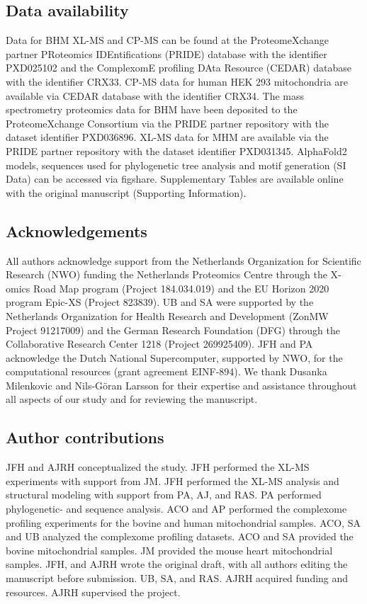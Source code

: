 \subsection*{Data availability}
Data for BHM XL-MS and CP-MS can be found at the ProteomeXchange partner PRoteomics IDEntifications (PRIDE) database with the identifier PXD025102 and the ComplexomE profiling DAta Resource (CEDAR) database with the identifier CRX33. CP-MS data for human HEK 293 mitochondria are available via CEDAR database with the identifier CRX34. The mass spectrometry proteomics data for BHM have been deposited to the ProteomeXchange Consortium via the PRIDE partner repository with the dataset identifier PXD036896. XL-MS data for MHM are available via the PRIDE partner repository with the dataset identifier PXD031345. AlphaFold2 models, sequences used for phylogenetic tree analysis and motif generation (SI Data) can be accessed via figshare. Supplementary Tables are available online with the original manuscript (Supporting Information).

\subsection*{Acknowledgements}
All authors acknowledge support from the Netherlands Organization for Scientific Research (NWO) funding the Netherlands Proteomics Centre through the X-omics Road Map program (Project 184.034.019) and the EU Horizon 2020 program Epic-XS (Project 823839). UB and SA were supported by the Netherlands Organization for Health Research and Development (ZonMW Project 91217009) and the German Research Foundation (DFG) through the Collaborative Research Center 1218 (Project 269925409). JFH and PA acknowledge the Dutch National Supercomputer, supported by NWO, for the computational resources (grant agreement EINF-894). We thank Dusanka Milenkovic and Nils-Göran Larsson for their expertise and assistance throughout all aspects of our study and for reviewing the manuscript.
    
\subsection*{Author contributions}
JFH and AJRH conceptualized the study. JFH performed the XL-MS experiments with support from JM. JFH performed the XL-MS analysis and structural modeling with support from PA, AJ, and RAS. PA performed phylogenetic- and sequence analysis. ACO and AP performed the complexome profiling experiments for the bovine and human mitochondrial samples. ACO, SA and UB analyzed the complexome profiling datasets. ACO and SA provided the bovine mitochondrial samples. JM provided the mouse heart mitochondrial samples. JFH, and AJRH wrote the original draft, with all authors editing the manuscript before submission. UB, SA, and RAS. AJRH acquired funding and resources. AJRH supervised the project.
    
